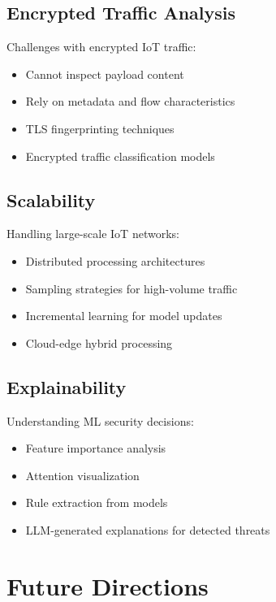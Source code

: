 \documentclass[12pt,a4paper]{article}
\begin{document}
\subsection{Encrypted Traffic Analysis}

Challenges with encrypted IoT traffic:
\begin{itemize}
    \item Cannot inspect payload content
    \item Rely on metadata and flow characteristics
    \item TLS fingerprinting techniques
    \item Encrypted traffic classification models
\end{itemize}

\subsection{Scalability}

Handling large-scale IoT networks:
\begin{itemize}
    \item Distributed processing architectures
    \item Sampling strategies for high-volume traffic
    \item Incremental learning for model updates
    \item Cloud-edge hybrid processing
\end{itemize}

\subsection{Explainability}

Understanding ML security decisions:
\begin{itemize}
    \item Feature importance analysis
    \item Attention visualization
    \item Rule extraction from models
    \item LLM-generated explanations for detected threats
\end{itemize}

\section{Future Directions}
\end{document}
